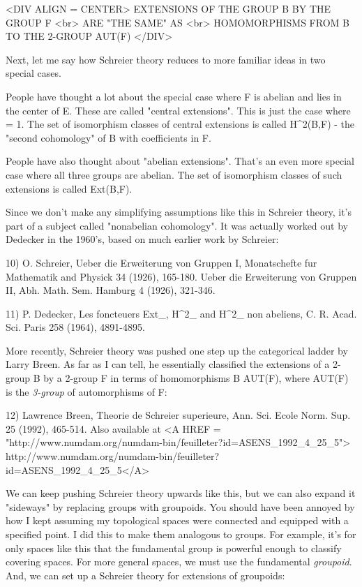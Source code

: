 <DIV ALIGN = CENTER>
                EXTENSIONS OF THE GROUP B BY THE GROUP F <br>
                            ARE "THE SAME" AS <br>
               HOMOMORPHISMS FROM B TO THE 2-GROUP AUT(F)
</DIV>

Next, let me say how Schreier theory reduces to more familiar ideas in two 
special cases.

People have thought a lot about the special case where F is abelian and 
lies in the center of E.  These are called "central extensions".  
This is just the case where \alpha  = 1.  The set 
of isomorphism classes of central extensions is called H^{2}(B,F) - 
the "second cohomology" of B with coefficients in F.

People have also thought about "abelian extensions".  
That's an even more special case where all three groups are abelian.  
The set of isomorphism classes of such extensions is called Ext(B,F).  

Since we don't make any simplifying assumptions like this in Schreier 
theory, it's part of a subject called "nonabelian cohomology".  
It was 
actually worked out by Dedecker in the 1960's, based on much earlier 
work by Schreier:

10) O. Schreier, Ueber die Erweiterung von Gruppen I, Monatschefte fur
Mathematik and Physick 34 (1926), 165-180.  Ueber die Erweiterung von 
Gruppen II, Abh. Math. Sem. Hamburg 4 (1926), 321-346.

11) P. Dedecker, Les foncteuers Ext_{\Pi }, 
H^{2}_{\Pi } and 
H^{2}_{\Pi } 
non abeliens,
C. R. Acad. Sci. Paris 258 (1964), 4891-4895.

More recently, Schreier theory was pushed one step up the categorical 
ladder by Larry Breen.  As far as I can tell, he essentially classified 
the extensions of a 2-group B by a 2-group F in terms of homomorphisms 
B \to  AUT(F), where AUT(F) is the \emph{3-group} of automorphisms of F:

12) Lawrence Breen, Theorie de Schreier superieure, Ann. Sci. Ecole Norm. 
Sup. 25 (1992), 465-514.  Also available at
<A HREF = "http://www.numdam.org/numdam-bin/feuilleter?id=ASENS_1992_4_25_5">
http://www.numdam.org/numdam-bin/feuilleter?id=ASENS_1992_4_25_5</A>

We can keep pushing Schreier theory upwards like this, but we can also 
expand it "sideways" by replacing groups with groupoids.  
You should have 
been annoyed by how I kept assuming my topological spaces were connected 
and equipped with a specified point.   I did this to make them analogous 
to groups.  For example, it's for only spaces like this that the fundamental 
group is powerful enough to classify covering spaces.  For more general
spaces, we must use the fundamental \emph{groupoid}. 
And, we can set up a Schreier theory for extensions of groupoids:

